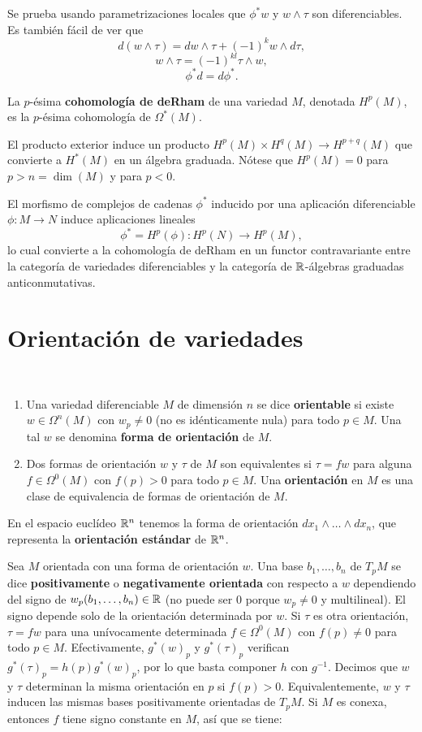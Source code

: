 \documentclass[CV.tex]{subfiles}
\begin{document}
Se prueba usando parametrizaciones locales que $\phi^*w$ y $w\land\tau$ son diferenciables. Es también fácil de ver que
\[
d(w\land\tau)=dw\land\tau+(-1)^kw\land d\tau,
\]
\[
w\land\tau=(-1)^{kl}\tau\land w,
\]
\[
\phi^*d=d\phi^*.
\]

\begin{defi}
La $p$-ésima \textbf{cohomología de deRham} de una variedad $M$, denotada $H^p(M)$, es la $p$-ésima cohomología de $\Omega^*(M)$. 
\end{defi}

El producto exterior induce un producto $H^p(M)\times H^q(M)\to H^{p+q}(M)$ que convierte a $H^*(M)$ en un álgebra graduada. Nótese que $H^p(M)=0$ para $p>n=\dim(M)$ y para $p<0$. 

El morfismo de complejos de cadenas $\phi^*$ inducido por una aplicación diferenciable $\phi:M\to N$ induce aplicaciones lineales
\[
\phi^*=H^p(\phi):H^p(N)\to H^p(M),
\]
lo cual convierte a la cohomología de deRham en un functor contravariante entre la categoría de variedades diferenciables y la categoría de $\mathbb{R}$-álgebras graduadas anticonmutativas.

\section{Orientación de variedades}

\begin{defi}\
\begin{enumerate}
\item Una variedad diferenciable $M$ de dimensión $n$ se dice \textbf{orientable} si existe $w\in\Omega^n(M)$ con $w_p\neq 0$ (no es idénticamente nula) para todo $p\in M$. Una tal $w$ se denomina \textbf{forma de orientación} de $M$.
\item Dos formas de orientación $w$ y $\tau$ de $M$ son equivalentes si $\tau=fw$ para alguna $f\in\Omega^0(M)$ con $f(p)>0$ para todo $p\in M$. Una \textbf{orientación} en $M$ es una clase de equivalencia de formas de orientación de $M$. 
\end{enumerate}
\end{defi}

En el espacio euclídeo $\mathbb{R}^n$ tenemos la forma de orientación $dx_1\land\dots\land dx_n$, que representa la \textbf{orientación estándar} de $\mathbb{R}^n$. 

Sea $M$ orientada con una forma de orientación $w$. Una base $b_1,\dots, b_n$ de $T_pM$ se dice \textbf{positivamente} o \textbf{negativamente  orientada} con respecto a $w$ dependiendo del signo de $w_p(b_1,\dots, b_n)\in\mathbb{R}$ (no puede ser 0 porque $w_p\neq 0$ y multilineal). El signo depende solo de la orientación determinada por $w$. Si $\tau$ es otra orientación, $\tau=fw$ para una unívocamente determinada $f\in\Omega^0(M)$ con $f(p)\neq 0$ para todo $p\in M$. Efectivamente, $g^*(w)_p$ y $g^*(\tau)_p$ verifican $g^*(\tau)_p=h(p)g^*(w)_p$, por lo que basta componer $h$ con $g^{-1}$. Decimos que $w$ y $\tau$ determinan la misma orientación en $p$ si $f(p)>0$. Equivalentemente, $w$ y $\tau$ inducen las mismas bases positivamente orientadas de $T_pM$. Si $M$ es conexa, entonces $f$ tiene signo constante en $M$, así que se tiene:
\end{document}
